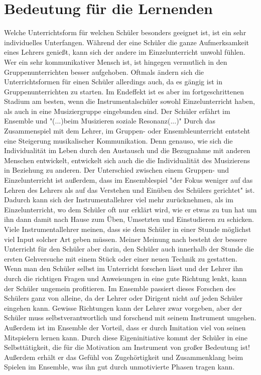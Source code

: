 \section{Bedeutung für die Lernenden}
Welche Unterrichtsform für welchen Schüler besonders geeignet ist, ist ein sehr
individuelles Unterfangen. Während der eine Schüler die ganze Aufmerksamkeit
eines Lehrers genießt, kann sich der andere im Einzelunterricht unwohl fühlen.
Wer ein sehr kommunikativer Mensch ist, ist hingegen vermutlich in den
Gruppenunterrichten besser aufgehoben. Oftmals ändern sich die Unterrichtsformen
für einen Schüler allerdings auch, da es gängig ist in Gruppenunterrichten zu
starten. Im
Endeffekt ist es aber im fortgeschrittenen Stadium am besten, wenn die
Instrumentalschüler sowohl Einzelunterricht haben, als auch in eine
Musiziergruppe eingebunden sind. Der Schüler erfährt im Ensemble und "(...)beim
Musizieren soziale Resonanz(...)" \autocite[28]{mitzscherlich:musikpsychologie}
Durch das Zusammenspiel mit dem Lehrer, im Gruppen- oder Ensembleunterricht
entsteht eine Steigerung musikalischer Kommunikation.
\autocite[99]{mitzscherlich:musikpsychologie} Denn genauso, wie sich die
Individualität im Leben durch den Austausch und die Bezugnahme mit anderen
Menschen entwickelt, entwickelt sich auch die die Individualität des Musizierens
in Beziehung zu anderen. Der Unterschied zwischen einem Gruppen- und
Einzelunterricht ist außerdem, dass im Ensemblespiel "der Fokus weniger auf das
Lehren des Lehrers als auf das Verstehen und Einüben des Schülers gerichtet"
ist. \autocite[31]{losert:die_kunst_zu_unterrichten} Dadurch kann sich der
Instrumentallehrer viel mehr zurücknehmen, als im Einzelunterricht, wo dem
Schüler oft nur erklärt wird, wie er etwas zu tun hat um ihn dann damit nach
Hause zum Üben, Umsetzten und Einstudieren zu schicken. Viele Instrumentallehrer
meinen, dass sie dem Schüler in einer Stunde möglichst viel Input solcher Art
geben müssen. Meiner Meinung nach besteht der bessere Unterricht für den Schüler
aber darin, den Schüler auch innerhalb der Stunde die ersten Gehversuche mit
einem Stück oder einer neuen Technik zu gestatten. Wenn man den Schüler selbst
im Unterricht forschen lässt und der Lehrer ihn durch die richtigen Fragen und
Anweisungen in eine gute Richtung lenkt, kann der Schüler ungemein profitieren.
Im Ensemble passiert dieses Forschen des Schülers ganz von alleine, da der
Lehrer oder Dirigent nicht auf jeden Schüler eingehen kann. Gewisse Richtungen
kann der Lehrer zwar vorgeben, aber der Schüler muss selbstverantwortlich und
forschend mit seinem Instrument umgehen. Außerdem ist im Ensemble der Vorteil,
dass er durch Imitation viel von seinen Mitspielern lernen kann. Durch diese
Eigeninitiative kommt der Schüler in eine Selbsttätigkeit, die für die
Motivation am Instrument von großer Bedeutung ist! Außerdem erhält er das Gefühl
von Zugehörtigkeit und Zusammenklang beim Spielen im Ensemble, was ihn gut durch
unmotivierte Phasen tragen kann.

